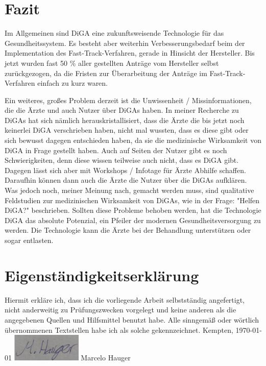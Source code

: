 \documentclass{article}
\begin{document}
	\section{Fazit}
		Im Allgemeinen sind DiGA eine zukunftsweisende Technologie für das Gesundheitssystem. Es besteht aber weiterhin Verbesserungsbedarf beim der Implementation des Fast-Track-Verfahren, gerade in Hinsicht der Hersteller. Bis jetzt wurden fast 50 \% aller gestellten Anträge vom Hersteller selbst zurückgezogen, da die Fristen zur Überarbeitung der Anträge im Fast-Track-Verfahren einfach zu kurz waren.\par 
		Ein weiteres, großes Problem derzeit ist die Unwissenheit / Missinformationen, die die Ärzte und auch Nutzer über DiGAs haben. In meiner Recherche zu DiGAs hat sich nämlich herauskristallisiert, dass die Ärzte die bis jetzt noch keinerlei DiGA verschrieben haben, nicht mal wussten, dass es diese gibt oder sich bewusst dagegen entschieden haben, da sie die medizinische Wirksamkeit von DiGA in Frage gestellt haben. Auch auf Seiten der Nutzer gibt es noch Schwierigkeiten, denn diese wissen teilweise auch nicht, dass es DiGA gibt. Dagegen lässt sich aber mit Workshops / Infotage für Ärzte Abhilfe schaffen. Daraufhin können dann auch die Ärzte die Nutzer über die DiGAs aufklären. Was jedoch noch, meiner Meinung nach, gemacht werden muss, sind qualitative Feldstudien zur medizinischen Wirksamkeit von DiGAs, wie in der Frage: "Helfen DiGA?" beschrieben. Sollten diese Probleme behoben werden, hat die Technologie DiGA das absolute Potenzial, ein Pfeiler der modernen Gesundheitsversorgung zu werden. Die Technologie kann die Ärzte bei der Behandlung unterstützen oder sogar entlasten.
		\newpage
	\section{Eigenständigkeitserklärung}
		Hiermit erkläre ich, dass ich die vorliegende Arbeit selbstständig angefertigt, nicht anderweitig zu Prüfungszwecken vorgelegt und keine anderen als die angegebenen Quellen und Hilfsmittel benutzt habe.
		\newline  
		\newline
		Alle sinngemäß oder wörtlich übernommenen Textstellen habe ich als solche gekennzeichnet.
		\newline
		\newline
		\newline
		Kempten, \today 
		\newline
		\newline
		\newline
		\includegraphics[width=0.25\textwidth]{./grafiken/unterschrift} 
		\newline
		Marcelo Hauger 
		\newpage
		

			   	 
\end{document}
